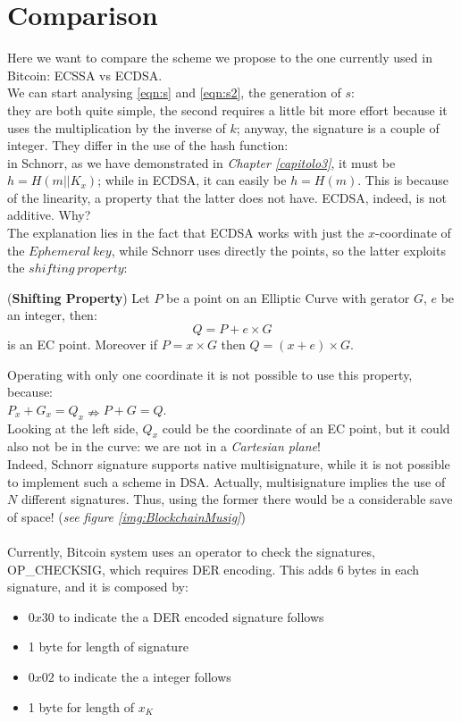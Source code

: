 \section{Comparison}
Here we want to compare the scheme we propose to the one currently used in Bitcoin: ECSSA vs ECDSA.\\
We can start analysing \eqref{eqn:s} and \eqref{eqn:s2}, the generation of $s$:\\
they are both quite simple, the second requires a little bit more effort because it uses the multiplication by the inverse of $k$; anyway, the signature is a couple of integer. They differ in the use of the hash function:\\
in Schnorr, as we have demonstrated in \textit{Chapter \eqref{capitolo3}}, it must be $h=H(m||K_{x})$; while in ECDSA, it can easily be $h=H(m)$. This is because of the linearity, a property that the latter does not have. ECDSA, indeed, is not additive. Why?\\
The explanation lies in the  fact that ECDSA works with just the $x$-coordinate of the $Ephemeral\ key$, while Schnorr uses directly the points, so the latter exploits the $shifting\ property$:
\begin{teorema}{(\textbf{Shifting Property})}
	Let $P$ be a point on an Elliptic Curve with gerator $G$, $e$ be an integer, then:
	\begin{equation*}
	Q=P+e\times G
	\end{equation*}
	is an EC point. Moreover if $P = x \times G$ then $Q=(x+e) \times G$.
\end{teorema}
Operating with only one coordinate it is not possible to use this property, because:\\
$P_{x}+G_{x}=Q_{x} \nRightarrow P+G=Q$.\\
Looking at the left side, $Q_{x}$ could be the coordinate of an EC point, but it could also not be in the curve: we are not in a \textit{Cartesian plane}!\\
Indeed, Schnorr signature supports native multisignature, while it is not possible to implement such a scheme in DSA. Actually, multisignature implies the use of $N$ different signatures. Thus, using the former there would be a considerable save of space! (\textit{see figure \eqref{img:BlockchainMusig}})\\
\\
Currently, Bitcoin system uses an operator to check the signatures, OP\_CHECKSIG, which requires DER encoding. This adds 6 bytes in each signature, and it is composed by:
\begin{itemize}
	\item $0x30$ to indicate the a DER encoded signature follows
	\item 1 byte for length of signature
	\item $0x02$ to indicate the a integer follows
	\item 1 byte for length of $x_{K}$
\end{itemize}
